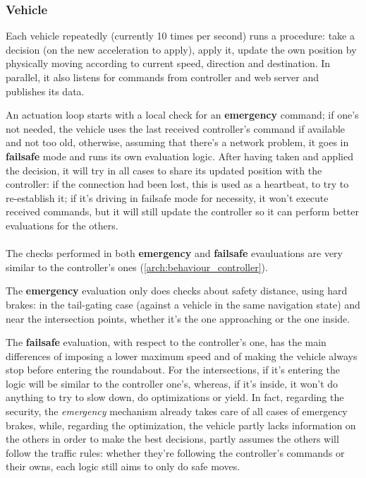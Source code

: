 \subsubsection{Vehicle}\label{arch:behaviour_vehicle}
Each vehicle repeatedly (currently 10 times per second) runs a procedure: take a
decision (on the new acceleration to apply), apply it, update the own position
by physically moving according to current speed, direction and destination. In
parallel, it also listens for commands from controller and web server and
publishes its data.

An actuation loop starts with a local check for an \textbf{emergency} command;
if one's not needed, the vehicle uses the last received controller's command if
available and not too old, otherwise, assuming that there's a network problem,
it goes in \textbf{failsafe} mode and runs its own evaluation logic. After
having taken and applied the decision, it will try in all cases to share its
updated position with the controller: if the connection had been lost, this is
used as a heartbeat, to try to re-establish it; if it's driving in failsafe mode
for necessity, it won't execute received commands, but it will still update the
controller so it can perform better evaluations for the others.
\\
\\
The checks performed in both \textbf{emergency} and \textbf{failsafe}
evauluations are very similar to the controller's ones
(\ref{arch:behaviour_controller}).

The \textbf{emergency} evaluation only does checks about safety distance, using
hard brakes: in the tail-gating case (against a vehicle in the same navigation
state) and near the intersection points, whether it's the one approaching or the
one inside.

The \textbf{failsafe} evaluation, with respect to the controller's one, has the
main differences of imposing a lower maximum speed and of making the vehicle
always stop before entering the roundabout. For the intersections, if it's
entering the logic will be similar to the controller one's, whereas, if it's
inside, it won't do anything to try to slow down, do optimizations or yield. In
fact, regarding the security, the \textit{emergency} mechanism already takes
care of all cases of emergency brakes, while, regarding the optimization, the
vehicle partly lacks information on the others in order to make the best
decisions, partly assumes the others will follow the traffic rules: whether
they're following the controller's commands or their owns, each logic still aims
to only do safe moves.

